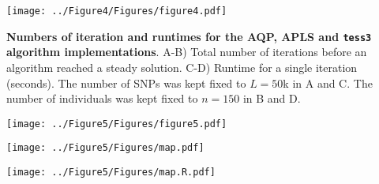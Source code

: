 \clearpage 
\newpage

\begin{center}
\texttt{[image: ../Figure4/Figures/figure4.pdf]}
\end{center}
 {\bf Numbers of iteration and runtimes for the AQP, APLS and {\tt tess3} algorithm implementations}. A-B)   Total number of iterations before an algorithm reached a steady solution. C-D) Runtime for a single iteration (seconds). The number of SNPs was kept fixed to $L = 50$k in A and C. The number of individuals was kept fixed to $n = 150$ in B and D. 


\clearpage 
\newpage

\begin{center}
\texttt{[image: ../Figure5/Figures/figure5.pdf]}
\end{center}

\clearpage 
\newpage

\begin{center}
\texttt{[image: ../Figure5/Figures/map.pdf]}
\end{center}

\clearpage 
\newpage

\begin{center}
\texttt{[image: ../Figure5/Figures/map.R.pdf]}
\end{center}



